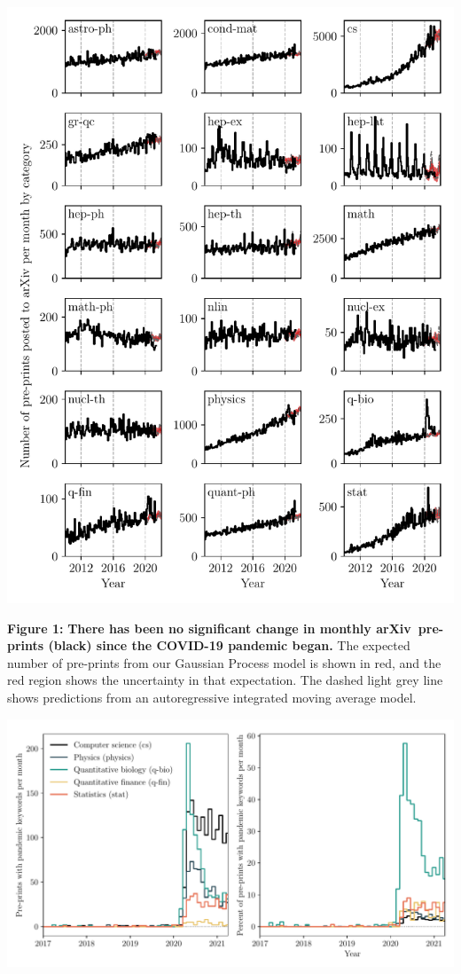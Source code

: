 \documentclass[a4paper,12pt]{article}
\newcommand{\arxiv}{arXiv}
\begin{document}
\begin{center}
\includegraphics[width=0.95\linewidth]{pre-prints-segmented-by-field}
\end{center}

\noindent \textbf{Figure 1:} \textbf{There has been no significant change in monthly \arxiv\ pre-prints (black) since the COVID-19 pandemic began.} The expected number of pre-prints from our Gaussian Process model is shown in red, and the red region shows the uncertainty in that expectation. The dashed light grey line shows predictions from an autoregressive integrated moving average model.

\newpage

\begin{center}
 \includegraphics[width=\linewidth]{pandemic-related-preprints.pdf}
\end{center}
\end{document}
